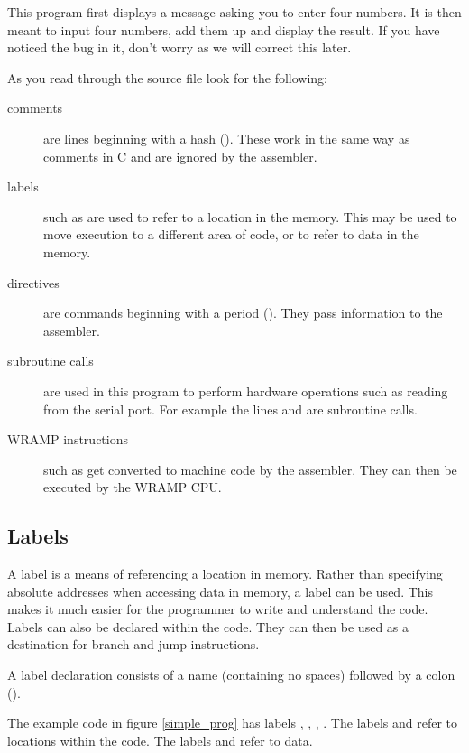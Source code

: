 This program first displays a message asking you to enter four numbers.  It
is then meant to input four numbers, add them up and display the result. 
If you have noticed the bug in it, don't worry as we will correct this later.

As you read through the source file look for the following:

\begin{description}
\item[comments] are lines beginning with a hash (\src{\#}).  These work in 
the same way as \src{//} comments in C and are ignored by the assembler.
%
\item[labels] such as  are used to refer to a location in the
memory.  This may be used to move execution to a different area of code,
or to refer to data in the memory.
%
\item[directives] are commands beginning with a period ().  They
pass information to the assembler.
%
\item[subroutine calls] are used in this program to perform hardware
operations such as reading from the serial port.  For example the
lines  and  are subroutine calls.
%
\item[WRAMP instructions] such as   get 
converted to machine code by the assembler.  They can then be executed by the 
WRAMP CPU.
%
\end{description}

\subsection{Labels}
A label is a means of referencing a location in memory.  Rather than
specifying absolute addresses when accessing data in memory, a label
can be used.  This makes it much easier for the programmer to write
and understand the code.  Labels can also be declared within the
code. They can then be used as a destination for branch and jump
instructions.

A label declaration consists of a name (containing no spaces) followed
by a colon (\src{:}).

The example code in figure \ref{simple_prog} has labels ,
, , .  The labels
 and  refer to locations within the code.  The
labels  and  refer to data.





